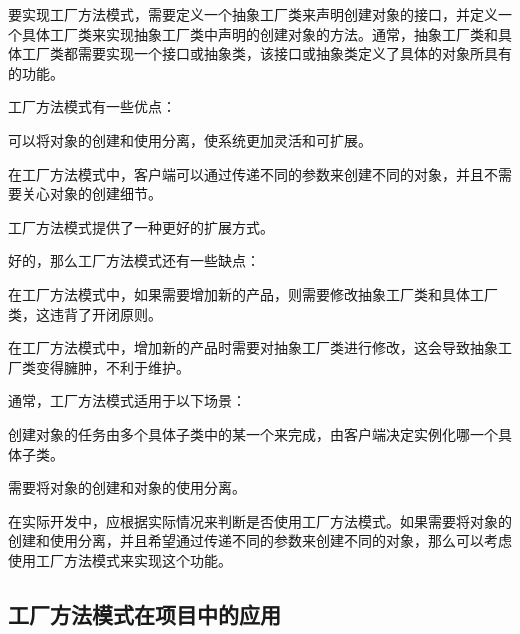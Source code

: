 \documentclass[cn,black,12pt,normal]{elegantnote}
\begin{document}
要实现工厂方法模式，需要定义一个抽象工厂类来声明创建对象的接口，并定义一个具体工厂类来实现抽象工厂类中声明的创建对象的方法。通常，抽象工厂类和具体工厂类都需要实现一个接口或抽象类，该接口或抽象类定义了具体的对象所具有的功能。

工厂方法模式有一些优点：

可以将对象的创建和使用分离，使系统更加灵活和可扩展。

在工厂方法模式中，客户端可以通过传递不同的参数来创建不同的对象，并且不需要关心对象的创建细节。

工厂方法模式提供了一种更好的扩展方式。

好的，那么工厂方法模式还有一些缺点：

在工厂方法模式中，如果需要增加新的产品，则需要修改抽象工厂类和具体工厂类，这违背了开闭原则。

在工厂方法模式中，增加新的产品时需要对抽象工厂类进行修改，这会导致抽象工厂类变得臃肿，不利于维护。

通常，工厂方法模式适用于以下场景：

创建对象的任务由多个具体子类中的某一个来完成，由客户端决定实例化哪一个具体子类。

需要将对象的创建和对象的使用分离。

在实际开发中，应根据实际情况来判断是否使用工厂方法模式。如果需要将对象的创建和使用分离，并且希望通过传递不同的参数来创建不同的对象，那么可以考虑使用工厂方法模式来实现这个功能。

\subsection{工厂方法模式在项目中的应用}
\end{document}
